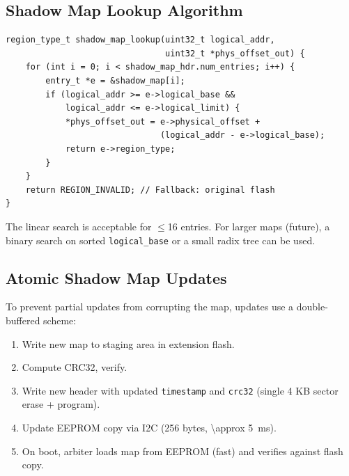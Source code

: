 \subsection{Shadow Map Lookup Algorithm}
\begin{lstlisting}[style=vbfcStyle, caption={Shadow Map Lookup (C)}, label={lst:shadow_lookup}]
region_type_t shadow_map_lookup(uint32_t logical_addr,
                                uint32_t *phys_offset_out) {
    for (int i = 0; i < shadow_map_hdr.num_entries; i++) {
        entry_t *e = &shadow_map[i];
        if (logical_addr >= e->logical_base &&
            logical_addr <= e->logical_limit) {
            *phys_offset_out = e->physical_offset + 
                               (logical_addr - e->logical_base);
            return e->region_type;
        }
    }
    return REGION_INVALID; // Fallback: original flash
}
\end{lstlisting}

The linear search is acceptable for $\le$16 entries. For larger maps (future), a binary search on sorted \texttt{logical\_base} or a small radix tree can be used.

\subsection{Atomic Shadow Map Updates}
To prevent partial updates from corrupting the map, updates use a double-buffered scheme:
\begin{enumerate}
    \item Write new map to staging area in extension flash.
    \item Compute CRC32, verify.
    \item Write new header with updated \texttt{timestamp} and \texttt{crc32} (single 4 KB sector erase + program).
    \item Update EEPROM copy via I2C (256 bytes, \SI{\approx 5}{ms}).
    \item On boot, arbiter loads map from EEPROM (fast) and verifies against flash copy.
\end{enumerate}